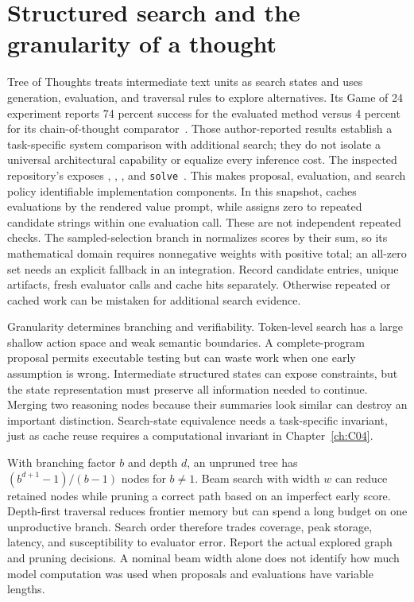 \section{Structured search and the granularity of a thought}
\label{sec:C09:search}
Tree of Thoughts treats intermediate text units as search states and uses generation, evaluation, and traversal rules to explore alternatives. Its Game of 24 experiment reports 74 percent success for the evaluated method versus 4 percent for its chain-of-thought comparator~\cite{yao2023tot}. Those author-reported results establish a task-specific system comparison with additional search; they do not isolate a universal architectural capability or equalize every inference cost. The inspected repository's  exposes , , , and \texttt{solve}~\cite{rewrite_tot_repo}. This makes proposal, evaluation, and search policy identifiable implementation components. In this snapshot,  caches evaluations by the rendered value prompt, while  assigns zero to repeated candidate strings within one evaluation call. These are not independent repeated checks. The sampled-selection branch in  normalizes scores by their sum, so its mathematical domain requires nonnegative weights with positive total; an all-zero set needs an explicit fallback in an integration. Record candidate entries, unique artifacts, fresh evaluator calls and cache hits separately. Otherwise repeated or cached work can be mistaken for additional search evidence.

Granularity determines branching and verifiability. Token-level search has a large shallow action space and weak semantic boundaries. A complete-program proposal permits executable testing but can waste work when one early assumption is wrong. Intermediate structured states can expose constraints, but the state representation must preserve all information needed to continue. Merging two reasoning nodes because their summaries look similar can destroy an important distinction. Search-state equivalence needs a task-specific invariant, just as cache reuse requires a computational invariant in Chapter~\ref{ch:C04}.

With branching factor $b$ and depth $d$, an unpruned tree has $(b^{d+1}-1)/(b-1)$ nodes for $b\neq1$. Beam search with width $w$ can reduce retained nodes while pruning a correct path based on an imperfect early score. Depth-first traversal reduces frontier memory but can spend a long budget on one unproductive branch. Search order therefore trades coverage, peak storage, latency, and susceptibility to evaluator error. Report the actual explored graph and pruning decisions. A nominal beam width alone does not identify how much model computation was used when proposals and evaluations have variable lengths.

